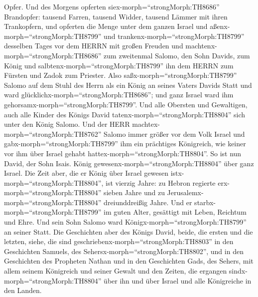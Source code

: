 Opfer. Und des Morgens opferten siex-morph=``strongMorph:TH8686''
Brandopfer: tausend Farren, tausend Widder, tausend Lämmer mit ihren
Trankopfern, und opferten die Menge unter dem ganzen Israel
 und aßenx-morph=``strongMorph:TH8799'' und
trankenx-morph=``strongMorph:TH8799'' desselben Tages vor dem HERRN mit
großen Freuden und machtenx-morph=``strongMorph:TH8686'' zum zweitenmal
Salomo, den Sohn Davids, zum König und
salbtenx-morph=``strongMorph:TH8799'' ihn dem HERRN zum Fürsten und
Zadok zum Priester.  Also saßx-morph=``strongMorph:TH8799''
Salomo auf dem Stuhl des Herrn als ein König an seines Vaters Davids
Statt und ward glücklichx-morph=``strongMorph:TH8686''; und ganz Israel
ward ihm gehorsamx-morph=``strongMorph:TH8799''.  Und alle
Obersten und Gewaltigen, auch alle Kinder des Königs David
tatenx-morph=``strongMorph:TH8804'' sich unter den König Salomo.
 Und der HERR machtex-morph=``strongMorph:TH8762'' Salomo
immer größer vor dem Volk Israel und gabx-morph=``strongMorph:TH8799''
ihm ein prächtiges Königreich, wie keiner vor ihm über Israel gehabt
hattex-morph=``strongMorph:TH8804''.  So ist nun David, der
Sohn Isais. König gewesenx-morph=``strongMorph:TH8804'' über ganz
Israel.  Die Zeit aber, die er König über Israel gewesen
istx-morph=``strongMorph:TH8804'', ist vierzig Jahre: zu Hebron regierte
erx-morph=``strongMorph:TH8804'' sieben Jahre und zu
Jerusalemx-morph=``strongMorph:TH8804'' dreiunddreißig Jahre.
 Und er starbx-morph=``strongMorph:TH8799'' im guten Alter,
gesättigt mit Leben, Reichtum und Ehre. Und sein Sohn Salomo ward
Königx-morph=``strongMorph:TH8799'' an seiner Statt.  Die
Geschichten aber des Königs David, beide, die ersten und die letzten,
siehe, die sind geschriebenx-morph=``strongMorph:TH8803'' in den
Geschichten Samuels, des Sehersx-morph=``strongMorph:TH8802'', und in
den Geschichten des Propheten Nathan und in den Geschichten Gads, des
Sehers,  mit allem seinem Königreich und seiner Gewalt und
den Zeiten, die ergangen sindx-morph=``strongMorph:TH8804'' über ihn und
über Israel und alle Königreiche in den Landen.
